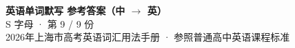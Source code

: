 \documentclass[10pt,a4paper]{article}
\begin{document}
\pagestyle{plain}

\begin{center}
{\LARGE\bfseries 英语单词默写 \quad 参考答案（中 $\to$ 英）}\\[0.22em]
{\large S 字母 · 第 9 / 9 份}\\[0.18em]
{\small 2026年上海市高考英语词汇用法手册 · 参照普通高中英语课程标准}
\end{center}

\vspace{0.2em}
\noindent{\color{rulegray}\rule{\textwidth}{0.8pt}}

\vspace{0.35em}

\vspace{0.25em}
\renewcommand{\arraystretch}{1.32}
\end{document}
